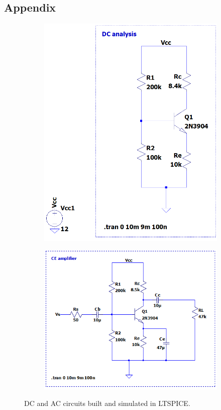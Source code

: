 \documentclass{homework}
\begin{document}
	\subsection*{Appendix}
	\begin{figure}[H]
		\centering
		\begin{subfigure}{0.4\linewidth}
			\includegraphics[width=\linewidth]{screenshot002}
		\end{subfigure}
		\hfil
		\begin{subfigure}{0.5\linewidth}
			\includegraphics[width=\linewidth]{screenshot003}
		\end{subfigure}
		\caption{DC and AC circuits built and simulated in LTSPICE.}
		\label{fig:screenshot002}
	\end{figure}
\end{document}
